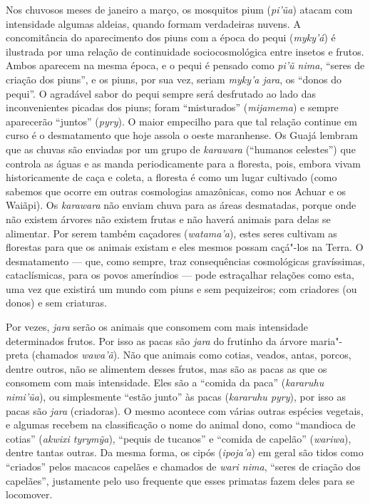 Nos chuvosos meses de janeiro a março, os mosquitos pium (\emph{pi'ũa})
atacam com intensidade algumas aldeias, quando formam verdadeiras
nuvens. A concomitância do aparecimento dos piuns com a época do pequi
(\emph{myky'á}) é ilustrada por uma relação de continuidade
sociocosmológica entre insetos e frutos. Ambos aparecem na mesma época,
e o pequi é pensado como \emph{pi'ũ nima}, ``seres de criação dos piuns'',
e os piuns, por sua vez, seriam \emph{myky'a jara}, os ``donos do pequi''.
O agradável sabor do pequi sempre será desfrutado ao lado das
inconvenientes picadas dos piuns; foram ``misturados'' (\emph{mijamema}) e
sempre aparecerão ``juntos'' (\emph{pyry}). O maior empecilho para que tal
relação continue em curso é o desmatamento que hoje assola o oeste
maranhense. Os Guajá lembram que as chuvas são enviadas por um grupo de
\emph{karawara} (``humanos celestes'') que controla as águas e as manda
periodicamente para a floresta, pois, embora vivam historicamente de
caça e coleta, a floresta é como um lugar cultivado (como sabemos que
ocorre em outras cosmologias amazônicas, como nos Achuar e os Waiãpi).
Os \emph{karawara} não enviam chuva para as áreas desmatadas, porque
onde não existem árvores não existem frutas e não haverá animais para
delas se alimentar. Por serem também caçadores (\emph{watama'a}), estes
seres cultivam as florestas para que os animais existam e eles mesmos
possam caçá"-los na Terra. O desmatamento --- que, como sempre, traz
consequências cosmológicas gravíssimas, cataclísmicas, para os povos
ameríndios --- pode estraçalhar relações como esta, uma vez que existirá
um mundo com piuns e sem pequizeiros; com criadores (ou donos) e sem
criaturas.

Por vezes, \emph{jara} serão os animais que consomem com mais
intensidade determinados frutos. Por isso as pacas são \emph{jara} do
frutinho da árvore maria"-preta (chamados \emph{wawa'ã}). Não que animais
como cotias, veados, antas, porcos, dentre outros, não se alimentem
desses frutos, mas são as pacas as que os consomem com mais intensidade.
Eles são a ``comida da paca'' (\emph{kararuhu nimi'ũa}), ou simplesmente
``estão junto'' às pacas (\emph{kararuhu pyry}), por isso as pacas são
\emph{jara} (criadoras). O mesmo acontece com várias outras espécies
vegetais, e algumas recebem na classificação o nome do animal dono, como
``mandioca de cotias'' (\emph{akwixi tyrymỹa}), ``pequis de tucanos'' e
``comida de capelão'' (\emph{wariwa}), dentre tantas outras. Da mesma
forma, os cipós (\emph{ipoja'a}) em geral são tidos como ``criados'' pelos
macacos capelães e chamados de \emph{wari nima}, ``seres de criação dos
capelães'', justamente pelo uso frequente que esses primatas fazem deles
para se locomover.

